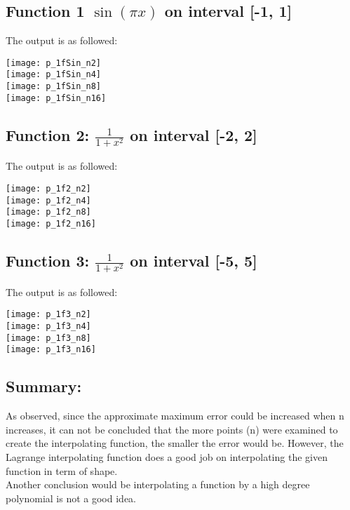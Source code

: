 \newpage
\subsection{Function 1 $\sin (\pi x)$ on interval [-1, 1]}
The output is as followed:\\
\begin{centering}
    \texttt{[image: p\_1fSin\_n2]}\\
    \texttt{[image: p\_1fSin\_n4]}\\
    \texttt{[image: p\_1fSin\_n8]}\\
    \texttt{[image: p\_1fSin\_n16]}\\
\end{centering}

\newpage
\subsection{Function 2: $\frac{1}{1+x^2}$ on interval [-2, 2]}
The output is as followed:\\
\begin{centering}
    \texttt{[image: p\_1f2\_n2]}\\
    \texttt{[image: p\_1f2\_n4]}\\
    \texttt{[image: p\_1f2\_n8]}\\
    \texttt{[image: p\_1f2\_n16]}\\
\end{centering}

\newpage
\subsection{Function 3: $\frac{1}{1+x^2}$ on interval [-5, 5]}
The output is as followed:\\
\begin{centering}
    \texttt{[image: p\_1f3\_n2]}\\
    \texttt{[image: p\_1f3\_n4]}\\
    \texttt{[image: p\_1f3\_n8]}\\
    \texttt{[image: p\_1f3\_n16]}\\
\end{centering}

\newpage
\subsection{Summary:}
As observed, since the approximate maximum error could be increased when n increases, it can not be concluded that the more points (n) were examined to create the interpolating function, the smaller the error would be. However, the Lagrange interpolating function does a good job on interpolating the given function in term of shape.\\
Another conclusion would be interpolating a function by a high degree polynomial is not a good idea.
